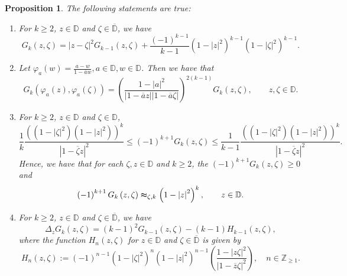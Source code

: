 \documentclass[10pt,oneside,reqno]{amsart}
\newtheorem{proposition}[theorem]{Proposition}
\theoremstyle{definition}
\theoremstyle{remark}
\newcommand{\abs}[1]{\left\lvert #1 \right\rvert}
\renewcommand{\le}{\leqslant}
\renewcommand{\ge}{\geqslant}
\newcommand{\D}{\mathbb D}
\numberwithin{equation}{section}
\begin{document}
\begin{proposition}
The following statements are true:
\begin{enumerate}
    \item For $k\ge 2$, $z \in \D$ and $\zeta \in \overline{\mathbb{D}}$, we have 
	\begin{equation*}
	    G_{k} \left( z, \zeta \right) = \abs{z-\zeta}^{2} G_{k-1} \left( z, \zeta \right) + \frac{\left( -1 \right)^{k-1}}{k-1} \left( 1-\abs{z}^{2} \right)^{k-1} \left( 1-\abs{\zeta}^{2} \right)^{k-1}.
	\end{equation*}

    \item Let $\varphi_{a} \left( w \right) = \frac{a-w}{1-\overline{a}w}, a\in \D, w \in \D$. Then we have that 
	\begin{equation}
	    G_{k} \left( \varphi_{a} \left( z \right) , \varphi_{a} \left( \zeta \right) \right) = \left( \frac{1-\abs{a}^{2}}{\abs{1-\overline{a}z} \abs{1-\overline{a}\zeta}} \right)^{2\left( k-1 \right)} G_{k} \left( z, \zeta \right), \qquad  z, \zeta \in \D.
	    \label{eqn:Green-Mobius}
	\end{equation}
    \item  For $k\ge 2$, $z \in \D$ and $\zeta \in \mathbb{D}$, 
	\begin{equation}
	    \frac{1}{k} \frac{ \left( \left( 1-\abs{\zeta}^{2} \right) \left( 1- \abs{z}^{2} \right)\right) ^{k} }{\abs{1-\overline{\zeta}z}^{2}} \le \left( -1 \right)^{k+1} G_{k} \left( z, \zeta \right) \le \frac{1}{k-1}  \frac{ \left( \left( 1-\abs{\zeta}^{2} \right) \left( 1- \abs{z}^{2} \right)\right) ^{k} }{\abs{1-\overline{\zeta}z}^{2}}.
        \label{eqn:Green-estimate}
	\end{equation}
	Hence, we have that for each $\zeta,z \in \D$ and $k \ge 2$, the $\left( -1 \right)^{k+1} G_{k} \left( z, \zeta \right)  \ge 0$ and 
	\begin{equation}
	    \left( -1 \right)^{k+1} G_{k} \left( z, \zeta \right) \thickapprox_{\zeta, k} \left( 1- \abs{z}^{2} \right)^{k}, \qquad  z\in \mathbb D.
	    \label{eqn:G_k-growth}
	\end{equation}
    \item For $k\ge 2$, $z \in \D$ and $\zeta \in \overline{\mathbb{D}}$, we have
    \begin{equation*}	
	\Delta_{z} G_{k} \left( z, \zeta \right) = \left( k-1 \right)^{2} G _{k-1} \left( z, \zeta \right) - \left( k-1 \right) H_{k-1} \left( z, \zeta \right),
    \end{equation*} where the function $H_n(z,\zeta)$ for $z\in\D$ and $\zeta\in\overline{\D}$ is given by
    \begin{equation*}
    H_{n} \left( z, \zeta \right) := \left (-1\right)^{n-1}\left( 1-\abs{\zeta}^{2} \right)^{n} \left( 1-\abs{z}^{2}  \right)^{n-1}  \left( \frac{1-\abs{z\zeta}^{2}}{\abs{1-\overline{z}\zeta}^{2}} \right),\quad  n\in \mathbb Z_{\geqslant 1}.
\end{equation*}
    \end{enumerate}
    
    \label{prop:properties-of-Green-functions}
\end{proposition}
\end{document}
